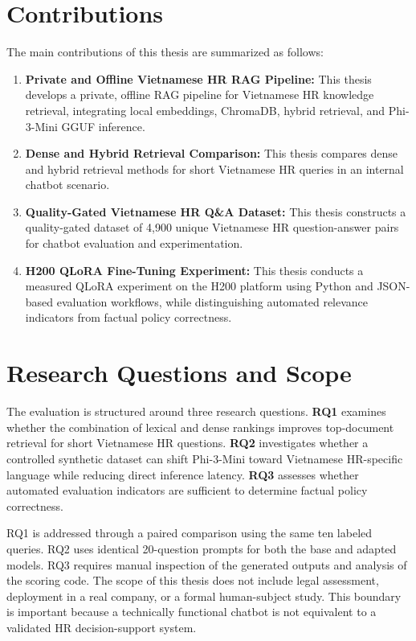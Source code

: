 \documentclass[12pt,a4paper,oneside]{report}
\begin{document}
\section{Contributions}
The main contributions of this thesis are summarized as follows:
\begin{enumerate}[leftmargin=1.2cm,itemsep=2pt]
  \item \textbf{Private and Offline Vietnamese HR RAG Pipeline:} This thesis
        develops a private, offline RAG pipeline for Vietnamese HR knowledge
        retrieval, integrating local embeddings, ChromaDB, hybrid retrieval,
        and Phi-3-Mini GGUF inference.
  \item \textbf{Dense and Hybrid Retrieval Comparison:} This thesis compares
        dense and hybrid retrieval methods for short Vietnamese HR queries in
        an internal chatbot scenario.
  \item \textbf{Quality-Gated Vietnamese HR Q\&A Dataset:} This thesis constructs
        a quality-gated dataset of 4,900 unique Vietnamese HR question-answer
        pairs for chatbot evaluation and experimentation.
  \item \textbf{H200 QLoRA Fine-Tuning Experiment:} This thesis conducts a
        measured QLoRA experiment on the H200 platform using Python and
        JSON-based evaluation workflows, while distinguishing automated
        relevance indicators from factual policy correctness.
\end{enumerate}

\section{Research Questions and Scope}
The evaluation is structured around three research questions. \textbf{RQ1}
examines whether the combination of lexical and dense rankings improves
top-document retrieval for short Vietnamese HR questions. \textbf{RQ2}
investigates whether a controlled synthetic dataset can shift Phi-3-Mini toward
Vietnamese HR-specific language while reducing direct inference latency.
\textbf{RQ3} assesses whether automated evaluation indicators are sufficient to
determine factual policy correctness.

RQ1 is addressed through a paired comparison using the same ten labeled queries.
RQ2 uses identical 20-question prompts for both the base and adapted models.
RQ3 requires manual inspection of the generated outputs and analysis of the
scoring code. The scope of this thesis does not include legal assessment,
deployment in a real company, or a formal human-subject study. This boundary is
important because a technically functional chatbot is not equivalent to a
validated HR decision-support system.
\end{document}
